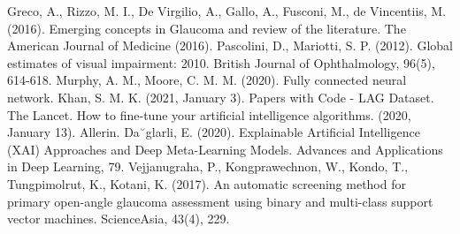 \documentclass[conference]{IEEEtran}
\begin{document}
\begin{thebibliography}{00}
 Greco, A., Rizzo, M. I., De Virgilio, A., Gallo, A., Fusconi, M., de Vincentiis, M. (2016). Emerging concepts in Glaucoma and review of the literature. The American Journal of Medicine (2016).
 Pascolini, D., Mariotti, S. P. (2012). Global estimates of visual impairment: 2010. British Journal of Ophthalmology, 96(5), 614-618. 
 Murphy, A. M., Moore, C. M. M. (2020). Fully connected neural network.
 Khan, S. M. K. (2021, January 3). Papers with Code - LAG Dataset. The Lancet.
 How to fine-tune your artificial intelligence algorithms. (2020, January 13). Allerin.
 Da˘glarli, E. (2020). Explainable Artificial Intelligence (XAI) Approaches and Deep Meta-Learning Models. Advances and Applications in Deep Learning, 79. 
 Vejjanugraha, P., Kongprawechnon, W., Kondo, T., Tungpimolrut, K., Kotani, K. (2017). An automatic screening method for primary open-angle glaucoma assessment using binary and multi-class support vector machines. ScienceAsia, 43(4), 229.

\end{thebibliography}
\end{document}
